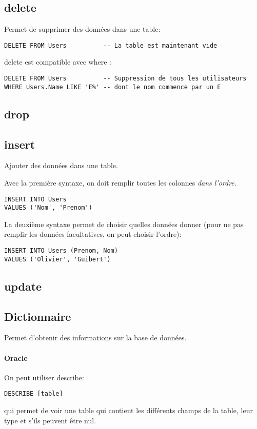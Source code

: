 \documentclass[10pt,a4paper,french]{article}
\begin{document}
\subsection{\gls{delete}}

Permet de supprimer des données dans une table:
\begin{verbatim}
DELETE FROM Users          -- La table est maintenant vide
\end{verbatim}

\gls{delete} est compatible avec \gls{where} :
\begin{verbatim}
DELETE FROM Users          -- Suppression de tous les utilisateurs
WHERE Users.Name LIKE 'E%' -- dont le nom commence par un E
\end{verbatim}

\subsection{\gls{drop}}

\subsection{\gls{insert}}\label{insert}

Ajouter des données dans une table.

Avec la première syntaxe, on doit remplir toutes les colonnes \textit{dans l'ordre}.
\begin{verbatim}
INSERT INTO Users
VALUES ('Nom', 'Prenom')
\end{verbatim}

La deuxième syntaxe permet de choisir quelles données donner (pour ne pas remplir les données facultatives, on peut choisir l'ordre):
\begin{verbatim}
INSERT INTO Users (Prenom, Nom)
VALUES ('Olivier', 'Guibert')
\end{verbatim}

\subsection{\gls{update}}\label{update}

\subsection{Dictionnaire}

Permet d'obtenir des informations sur la base de données.

\paragraph{Oracle} On peut utiliser \gls{describe}:
\begin{verbatim}
DESCRIBE [table]
\end{verbatim}
qui permet de voir une table qui contient les différents champs de la table, leur type et s'ils peuvent être nul.
\end{document}
